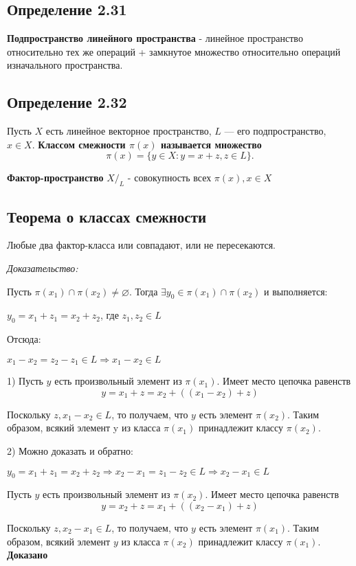 \documentclass[12pt]{article}
\begin{document}
\subsection*{Определение 2.31}
	\textbf{Подпространство линейного пространства} - линейное пространство относительно тех же операций + замкнутое множество относительно операций изначального пространства.
	
\subsection*{Определение 2.32}	\label{eq102}
	Пусть $X$ есть линейное векторное пространство, $L$ — его подпространство, $x \in X$. \textbf{Классом смежности $\pi(x)$ называется множество} 
	$$\pi(x) = \{ y \in X : y = x + z, z \in L \}.$$
	
	\textbf{Фактор-пространство} $X\text{/}_L$ - совокупность всех $\pi(x), x \in X$
	
\subsection{Теорема о классах смежности}
		
	Любые два фактор-класса или совпадают, или не пересекаются.
	
\textit{Доказательство:}

	Пусть $\pi(x_1) \cap \pi(x_2) \neq \varnothing$.
	Тогда $\exists y_0 \in \pi(x_1) \cap \pi(x_2)$ и выполняется:
 	
 	$y_0 = x_1 + z_1 = x_2 + z_2$, где $z_1, z_2 \in L$
 	
 	Отсюда:
 	
 	$x_1 - x_2 = z_2 - z_1 \in L	 \Rightarrow x_1 - x_2 \in L$
	
	 1) Пусть $y$ есть произвольный элемент из $\pi(x_1)$. Имеет место цепочка равенств
	  $$y = x_1 + z = x_2 + ((x_1 - x_2) + z) $$

Поскольку $z, x_1 - x_2 \in L$, то получаем, что $y$ есть элемент $\pi(x_2)$. 
Таким образом, всякий элемент y из класса $\pi(x_1)$ принадлежит классу $\pi(x_2)$.

	2) Можно доказать и обратно:

	$y_0 = x_1 + z_1 = x_2 + z_2 \Rightarrow x_2 - x_1 = z_1 - z_2 \in L	\Rightarrow x_2 - x_1 \in L$
	
		 Пусть $y$ есть произвольный элемент из $\pi(x_2)$. Имеет место цепочка равенств
	  $$y = x_2 + z = x_1 + ((x_2 - x_1) + z) $$
	
Поскольку $z, x_2 - x_1 \in L$, то получаем, что $y$ есть элемент $\pi(x_1)$. 
Таким образом, всякий элемент $y$ из класса $\pi(x_2)$ принадлежит классу $\pi(x_1)$.	
	\textbf{Доказано}
	
\end{document}

